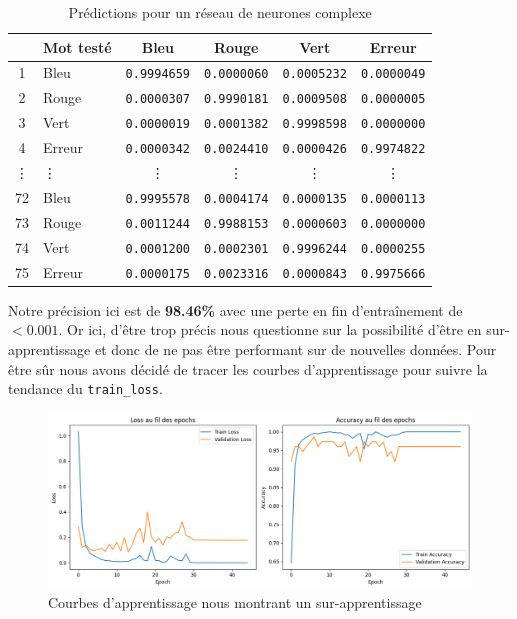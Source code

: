 \documentclass[a4paper,11pt]{article}
\begin{document}
\begin{table}[H]
\centering
\begin{tabular}{clcccc}
\toprule
& \textbf{Mot testé} & \textbf{Bleu} & \textbf{Rouge} & \textbf{Vert} & \textbf{Erreur} \\
\midrule
1 & Bleu & \texttt{0.9994659} & \texttt{0.0000060} & \texttt{0.0005232} & \texttt{0.0000049} \\
2 & Rouge & \texttt{0.0000307} & \texttt{0.9990181} & \texttt{0.0009508} & \texttt{0.0000005} \\
3 & Vert & \texttt{0.0000019} & \texttt{0.0001382} & \texttt{0.9998598} & \texttt{0.0000000} \\
4 & Erreur & \texttt{0.0000342} & \texttt{0.0024410} & \texttt{0.0000426} & \texttt{0.9974822} \\
\vdots & \vdots & \vdots & \vdots & \vdots & \vdots \\
72 & Bleu & \texttt{0.9995578} & \texttt{0.0004174} & \texttt{0.0000135} & \texttt{0.0000113} \\
73 & Rouge & \texttt{0.0011244} & \texttt{0.9988153} & \texttt{0.0000603} & \texttt{0.0000000} \\
74 & Vert & \texttt{0.0001200} & \texttt{0.0002301} & \texttt{0.9996244} & \texttt{0.0000255} \\
75 & Erreur & \texttt{0.0000175} & \texttt{0.0023316} & \texttt{0.0000843} & \texttt{0.9975666} \\
\bottomrule
\end{tabular}
\caption{Prédictions pour un réseau de neurones complexe}
\end{table}
Notre précision ici est de \textbf{98.46\%} avec une perte en fin d'entraînement de $<0.001$. Or ici, d'être trop précis nous questionne sur la possibilité d'être en sur-apprentissage et donc de ne pas être performant sur de nouvelles données. Pour être sûr nous avons décidé de tracer les courbes d'apprentissage pour suivre la tendance du \texttt{train\_loss}.
\begin{figure}[H]
\centering
\includegraphics[scale=0.5]{images/overfitting1.png}
\caption{Courbes d'apprentissage nous montrant un sur-apprentissage}
\end{figure}
\end{document}
